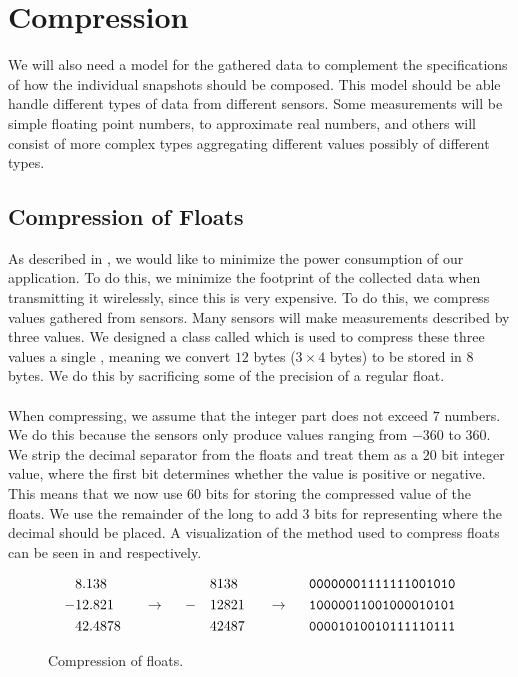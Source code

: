 
\section{Compression}
\label{sec:compression}
We will also need a model for the gathered data to complement the specifications of how the individual snapshots should be composed. This model should be able handle different types of data from different sensors. Some measurements will be simple floating point numbers, to approximate real numbers, and others will consist of more complex types aggregating different values possibly of different types.



\subsection{Compression of Floats}
As described in , we would like to minimize the power consumption of our application. To do this, we minimize the footprint of the collected data when transmitting it wirelessly, since this is very expensive. To do this, we compress values gathered from sensors. Many sensors will make measurements described by three  values. We designed a class called  which is used to compress these three values a single , meaning we convert $12$ bytes ($3 \times 4$ bytes) to be stored in $8$ bytes. We do this by sacrificing some of the precision of a regular float.
\\\\
When compressing, we assume that the integer part does not exceed $7$ numbers. We do this because the sensors only produce values ranging from $-360$ to $360$. We strip the decimal separator from the floats and treat them as a $20$ bit integer value, where the first bit determines whether the value is positive or negative. This means that we now use $60$ bits for storing the compressed value of the floats. We use the remainder of the long to add 3 bits for representing where the decimal should be placed. A visualization of the method used to compress floats can be seen in  and  respectively.
\begin{figure}[!htbp]
    \begin{alignat*}{6}
       &8.138   &&                   &&   && 8138  &&                   && \text{\texttt{00000001111111001010}} \\
      -&12.821  && ~~ \rightarrow ~~ && - && 12821 && ~~ \rightarrow ~~ && \text{\texttt{10000011001000010101}} \\
       &42.4878 &&                   &&   && 42487 &&                   && \text{\texttt{00001010010111110111}} 
    \end{alignat*}
    \caption{Compression of floats.}
    \label{fig:float_triple_convert}
\end{figure}

